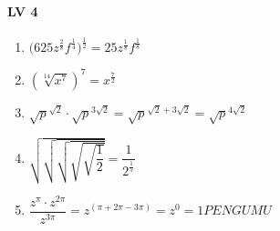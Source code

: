 \documentclass[12pt,a4paper]{article}
\begin{document}
	\paragraph{LV 4}
	\begin{enumerate}
			\item $\big(625z^{\frac{2}{8}}f^{\frac{1}{4}}\big)^{\frac{1}{2}}=25z^{\frac{1}{8}}f^{\frac{1}{8}}$
			\item $(\sqrt[14]{x^7})^7=x^{\frac{7}{2}}$
			\item $\sqrt{p}^{\sqrt{2}} \cdot \sqrt{p}^{3\sqrt{2}}=\sqrt{p}^{\sqrt{2}+3\sqrt{2}}=\sqrt{p}^{4\sqrt{2}}$
			\item $\sqrt{\sqrt{\sqrt{\sqrt{\sqrt{\dfrac{1}{2}}}}}}=\dfrac{1}{2^\frac{1}{5}}$
			\item $\dfrac{z^\pi\cdot z^{2\pi}}{z^{3\pi}}=z^{(\pi+2\pi-3\pi)}=z^0=1PENGUMU$
	\end{enumerate}
	
	
\end{document}
